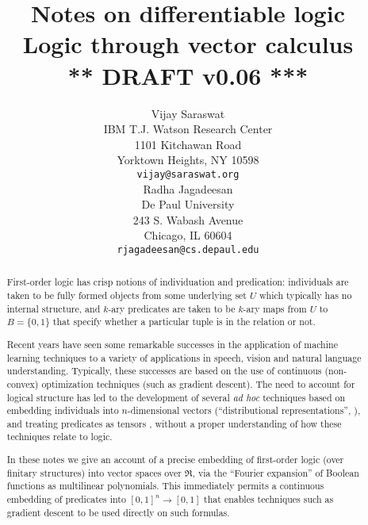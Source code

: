 \documentclass{article} %
\newcommand{\keywords}[1]{\par\addvspace\baselineskip
\noindent\keywordname\enspace\ignorespaces#1}
\begin{document}
%

\long{}
\def\mtimes{}
\def\LL#1{\llbracket #1 \rrbracket}
\title{Notes on differentiable logic \\
{\small Logic through vector calculus} \\
{\small *** DRAFT v0.06 ***}}

\author{Vijay Saraswat \\
IBM T.J. Watson Research Center\\
1101 Kitchawan Road\\
Yorktown Heights, NY 10598 \\
\texttt{vijay@saraswat.org} \\
\And
Radha Jagadeesan \\
De Paul University \\
243 S. Wabash Avenue \\
Chicago, IL 60604 \\
\texttt{rjagadeesan@cs.depaul.edu}
}

\newcommand{\fix}{\marginpar{FIX}}
\newcommand{\new}{\marginpar{NEW}}

\nipsfinalcopy %

\maketitle

\begin{abstract}
First-order logic has crisp notions of individuation and predication: individuals are taken  to be fully formed objects from some underlying set $U$ which typically has no internal structure, and $k$-ary predicates are taken to be $k$-ary maps from $U$ to $B=\{0,1\}$ that specify whether a particular tuple is in the relation or not. 

Recent years have seen some remarkable successes in the application of machine learning techniques to a variety of applications in speech, vision and natural language understanding. Typically, these successes are based on the use of continuous (non-convex) optimization techniques (such as gradient descent). The need to account for logical structure has led to the development of several {\em ad hoc} techniques based on embedding individuals into $n$-dimensional vectors (``distributional representations'', \cite{unified-arch-nlp,mikolov-word-vec,baroni2014don}), and treating predicates as tensors \cite{coecke-2010,grefenstette-2013,socher-ntn-2013,bishan-iclr15,rocktaschel-2015,order-embedding-kiros,TransIE}, without a proper understanding of how these techniques relate to logic. 

In these notes we give an account of a precise embedding of first-order logic (over finitary structures) into vector spaces over $\Re$, via the ``Fourier expansion'' of Boolean functions as multilinear polynomials. This immediately permits a continuous embedding of predicates into $[0,1]^n \rightarrow [0,1]$ that enables techniques such as gradient descent to be used directly on such formulas.

\end{abstract}
\end{document}
